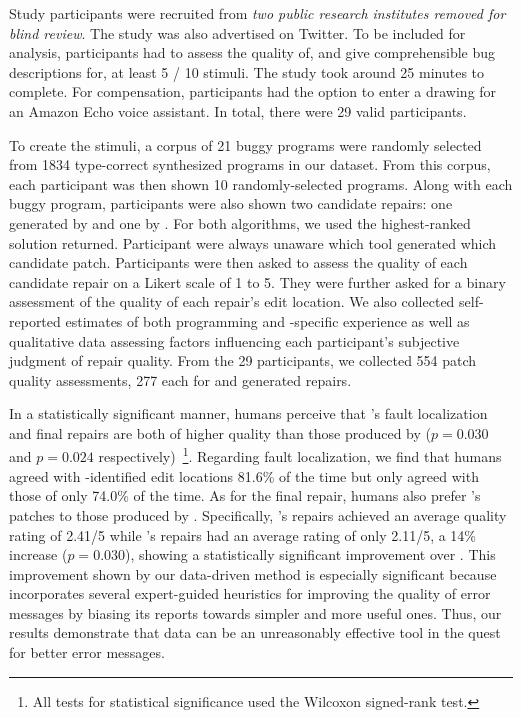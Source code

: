 %
Study participants were recruited from \emph{two public research
institutes removed for blind review}. The study was also advertised on Twitter.
To be included for analysis, participants had to assess the quality of, and give
comprehensible bug descriptions for, at least 5 / 10 stimuli. The study took around
25 minutes to complete. For compensation, participants had the option to enter a
drawing for an Amazon Echo voice assistant. In total, there were
29 valid participants.

To create the stimuli, a corpus of 21 buggy programs were randomly selected from
1834 type-correct synthesized programs in our dataset. From this corpus, each
participant was then shown 10 randomly-selected programs. Along with each buggy
program, participants were also shown two candidate repairs: one generated by
\toolname and one by \seminal. For both algorithms, we used the highest-ranked
solution returned. Participant were always unaware which tool generated which
candidate patch. Participants were then asked to assess the quality of each
candidate repair on a Likert scale of 1 to 5. They were further asked for a
binary assessment of the quality of each repair's edit location.
We also collected self-reported estimates of both programming and
\ocaml-specific experience as well as qualitative data assessing factors
influencing each participant's subjective judgment of repair quality.
From the 29 participants, we collected 554 patch quality assessments, 277 each
for \toolname and \seminal generated repairs.


%
In a statistically significant manner, humans perceive that
\toolname's fault localization and final repairs are both 
of higher quality than those produced by \seminal ($p=0.030$ 
and $p=0.024$ respectively)~\footnote{All tests for statistical 
significance used the Wilcoxon signed-rank test.}.
%
Regarding fault localization, we find that humans agreed
with \toolname-identified edit locations 81.6\% of the time 
but only agreed with those of \seminal only 74.0\% of the time. 
%
%
As for the final repair, humans also prefer \toolname's patches
to those produced by \seminal. Specifically, \toolname's repairs 
achieved an average quality rating of 2.41/5 while \seminal's 
repairs had an average rating of only 2.11/5, a 14\% increase ($p=0.030$),
showing a statistically significant improvement over \seminal.
%
This improvement shown by our data-driven method is especially 
significant because \seminal incorporates several expert-guided 
heuristics for improving the quality of error messages by biasing 
its reports towards simpler and more useful ones. 
%
Thus, our results demonstrate that data can be an unreasonably 
effective tool in the quest for better error messages.

